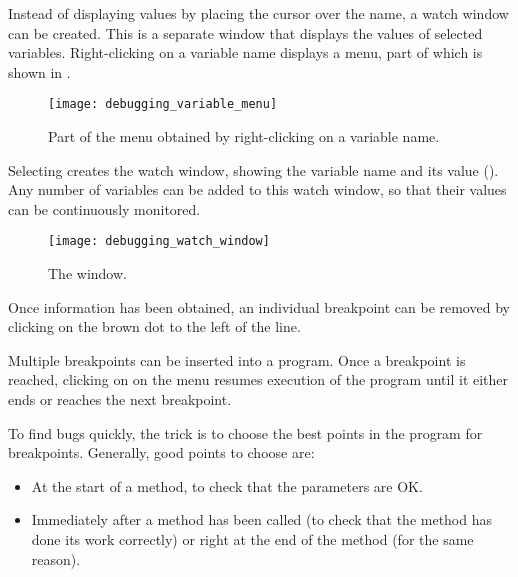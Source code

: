 			Instead of displaying values by placing the cursor over the name, a watch window can be created. This is a separate window that displays the values of selected variables. Right-clicking on a variable name displays a menu, part of which is shown in .
			\begin{figure}[bth]
				\centering
				\texttt{[image: debugging\_variable\_menu]}
				\caption{Part of the menu obtained by right-clicking on a variable name.}
				\label{fig:debugging_variable_menu}
			\end{figure}
			
			Selecting  creates the watch window, showing the variable name and its value (). Any number of variables can be added to this watch window, so that their values can be continuously monitored.
			\begin{figure}[bth]
				\centering
				\texttt{[image: debugging\_watch\_window]}
				\caption{The  window.}
				\label{fig:debugging_watch_window}
			\end{figure}
			
			Once information has been obtained, an individual breakpoint can be removed by clicking on the brown dot to the left of the line.
			
			Multiple breakpoints can be inserted into a program. Once a breakpoint is reached, clicking on  on the  menu resumes execution of the program until it either ends or reaches the next breakpoint.
			
			To find bugs quickly, the trick is to choose the best points in the program for breakpoints. Generally, good points to choose are:
			\begin{itemize}
	      \item At the start of a method, to check that the parameters are OK.
  	    \item Immediately after a method has been called (to check that the method has done its work correctly) or right at the end of the method (for the same reason).
			\end{itemize}


